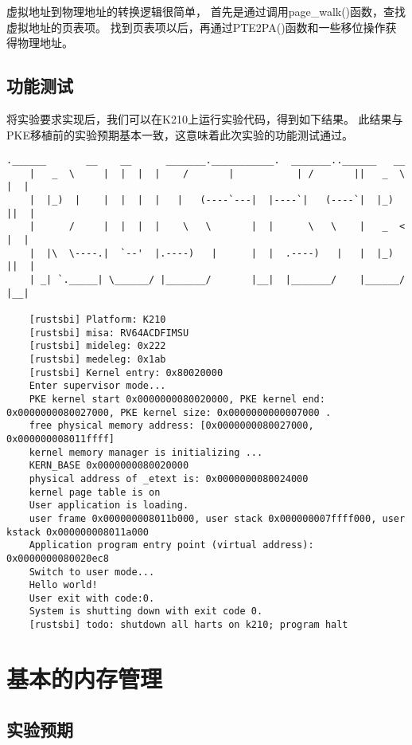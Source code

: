 虚拟地址到物理地址的转换逻辑很简单，
首先是通过调用page\_walk()函数，查找虚拟地址的页表项。
找到页表项以后，再通过PTE2PA()函数和一些移位操作获得物理地址。

\subsection{功能测试}

将实验要求实现后，我们可以在K210上运行实验代码，得到如下结果。
此结果与PKE移植前的实验预期基本一致，这意味着此次实验的功能测试通过。

\begin{lstlisting}[caption={lab4实验结果（移植K210后）}]
    .______       __    __      _______.___________.  _______..______   __
    |   _  \     |  |  |  |    /       |           | /       ||   _  \ |  |
    |  |_)  |    |  |  |  |   |   (----`---|  |----`|   (----`|  |_)  ||  |
    |      /     |  |  |  |    \   \       |  |      \   \    |   _  < |  |
    |  |\  \----.|  `--'  |.----)   |      |  |  .----)   |   |  |_)  ||  |
    | _| `._____| \______/ |_______/       |__|  |_______/    |______/ |__|
    
    [rustsbi] Platform: K210
    [rustsbi] misa: RV64ACDFIMSU
    [rustsbi] mideleg: 0x222
    [rustsbi] medeleg: 0x1ab
    [rustsbi] Kernel entry: 0x80020000
    Enter supervisor mode...
    PKE kernel start 0x0000000080020000, PKE kernel end: 0x0000000080027000, PKE kernel size: 0x0000000000007000 .
    free physical memory address: [0x0000000080027000, 0x000000008011ffff] 
    kernel memory manager is initializing ...
    KERN_BASE 0x0000000080020000
    physical address of _etext is: 0x0000000080024000
    kernel page table is on 
    User application is loading.
    user frame 0x000000008011b000, user stack 0x000000007ffff000, user kstack 0x000000008011a000 
    Application program entry point (virtual address): 0x0000000080020ec8
    Switch to user mode...
    Hello world!
    User exit with code:0.
    System is shutting down with exit code 0.
    [rustsbi] todo: shutdown all harts on k210; program halt    
\end{lstlisting}

\section{基本的内存管理}

\subsection{实验预期}

